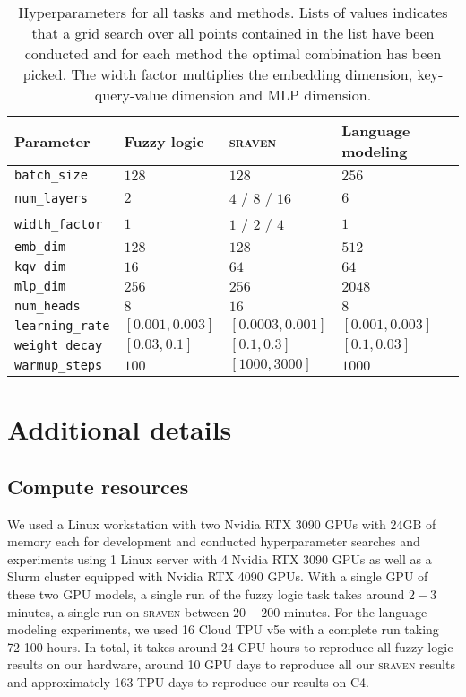 \documentclass{article} \usepackage{iclr2025,times}
\begin{document}
\begin{table}[htb]
\centering
\caption{Hyperparameters for all tasks and methods. Lists of values indicates that a grid search over all points contained in the list have been conducted and for each method the optimal combination has been picked. The width factor multiplies the embedding dimension, key-query-value dimension and MLP dimension.}
\label{apptab:hyperparameters}
\begin{tabular}{@{}llll@{}}
\toprule
Parameter   & Fuzzy logic  & \textsc{sraven} & Language modeling     \\ \midrule
\texttt{batch\_size}   & $128$    & $128$ & $256$      \\
\texttt{num\_layers}   & $2$    & $4$ / $8$ / $16$ & $6$      \\
\texttt{width\_factor} & $1$    & $1$ / $2$ / $4$ & $1$      \\
\texttt{emb\_dim}   & $128$    & $128$    & $512$      \\
\texttt{kqv\_dim}   & $16$    & $64$    & $64$      \\
\texttt{mlp\_dim}   & $256$    & $256$    & $2048$      \\
\texttt{num\_heads}   & $8$    & $16$    & $8$      \\
\texttt{learning\_rate}  & $[0.001, 0.003]$ & $[0.0003, 0.001]$ & $[0.001, 0.003]$ \\
\texttt{weight\_decay}  & $[0.03, 0.1]$ & $[0.1, 0.3]$  & $[0.1, 0.03]$      \\
\texttt{warmup\_steps}  & $100$    & $[1000, 3000]$ & $1000$      \\ \bottomrule
\end{tabular}
\end{table}






\clearpage

\section{Additional details}

\subsection{Compute resources}
\label{appsec:compute-resources}
We used a Linux workstation with two Nvidia RTX 3090 GPUs with 24GB of memory each for development and conducted hyperparameter searches and experiments using 1 Linux server with 4 Nvidia RTX 3090 GPUs as well as a Slurm cluster equipped with Nvidia RTX 4090 GPUs.
With a single GPU of these two GPU models, a single run of the fuzzy logic task takes around $2-3$ minutes, a single run on \textsc{sraven} between $20-200$ minutes.
For the language modeling experiments, we used 16 Cloud TPU v5e with a complete run taking 72-100 hours.
In total, it takes around 24 GPU hours to reproduce all fuzzy logic results on our hardware, around 10 GPU days to reproduce all our \textsc{sraven} results and approximately 163 TPU days to reproduce our results on C4.
\end{document}

